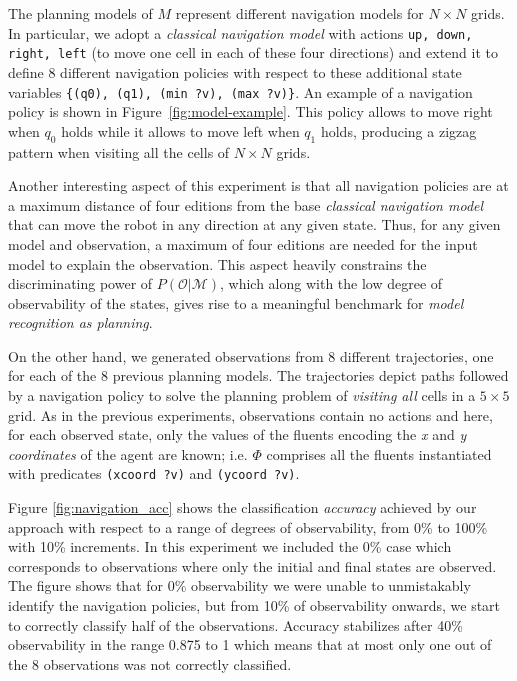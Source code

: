 \documentclass[letterpaper]{article} %
\begin{document}
The planning models of $M$ represent different navigation models for $N\times N$ grids. In particular, we adopt a {\em classical navigation model} with actions {\tt\small up, down, right, left} (to move one cell in each of these four directions) and extend it to define 8 different navigation policies with respect to these additional state variables {\tt\small \{(q0), (q1), (min ?v), (max ?v)\}}. An example of a navigation policy is shown in Figure~\ref{fig:model-example}. This policy allows to move right when $q_0$ holds while it allows to move left when $q_1$ holds, producing a zigzag pattern when visiting all the cells of $N\times N$ grids.

Another interesting aspect of this experiment is that all navigation policies are at a maximum distance of four editions from the base {\em classical navigation model} that can move the robot in any direction at any given state. Thus, for any given model and observation, a maximum of four editions are needed for the input model to explain the observation. This aspect heavily constrains the discriminating power of $P(\mathcal{O}|\mathcal{M})$, which along with the low degree of observability of the states, gives rise to a meaningful benchmark for {\em model recognition as planning}.

On the other hand, we generated observations from 8 different trajectories, one for each of the 8 previous planning models. The trajectories depict paths followed by a navigation policy to solve the planning problem of {\em visiting all} cells in a $5\times 5$ grid. As in the previous experiments, observations contain no actions and here, for each observed state, only the values of the fluents encoding the {\em x} and {\em y coordinates} of the agent are known; i.e. $\Phi$ comprises all the fluents instantiated with predicates {\tt\small (xcoord ?v)} and {\tt\small (ycoord ?v)}.


Figure \ref{fig:navigation_acc} shows the classification {\em accuracy} achieved by our approach with respect to a range of degrees of observability, from 0\% to 100\% with 10\% increments. In this experiment we included the 0\% case which corresponds to observations where only the initial and final states are observed. The figure shows that for 0\% observability we were unable to unmistakably identify the navigation policies, but from 10\% of observability onwards, we start to correctly classify half of the observations. Accuracy stabilizes after 40\% observability in the range 0.875 to 1 which means that at most only one out of the 8 observations was not correctly classified.
\end{document}
